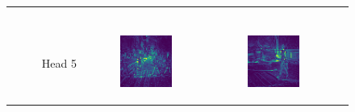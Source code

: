\begin{figure}
\begin{tabular}{r p{\horspace} p{\horspace} p{\horspace}}
\begin{subfigure}[b]{\subfigwidth}
    \end{subfigure} \\
    Head 5 &
    \begin{subfigure}[b]{\subfigwidth}
        \includegraphics[width=\subfigwidth]{images/vit_attention/1/attn-head4.png}
    \end{subfigure}
    \hfill &
    \begin{subfigure}[b]{\subfigwidth}
        \includegraphics[width=\subfigwidth]{images/vit_attention/2/attn-head4.png}

\end{subfigure}
\end{tabular}
\end{figure}
